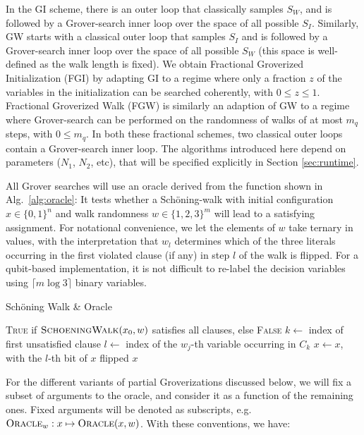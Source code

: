 \documentclass[a4paper,aps,floatfix]{revtex4}
\begin{document}
In the GI scheme, there is an outer loop that classically samples $S_W$, and is followed by a Grover-search inner loop over the space of all possible $S_I$. Similarly, GW starts with a classical outer loop that samples $S_I$ and is followed by a Grover-search inner loop over the space of all possible $S_W$ (this space is well-defined as the walk length is fixed).
We obtain Fractional Groverized Initialization (FGI) by adapting GI to a regime where only a fraction $z$ of the variables in the initialization can be searched coherently, with $0\le z \le1$. 
Fractional Groverized Walk (FGW) is similarly an adaption of GW to a regime where Grover-search can be performed on the randomness of walks of at most $m_q$ steps, with $0 \le m_q$. 
In both these fractional schemes, two classical outer loops contain a Grover-search inner loop.  
The algorithms introduced here depend on parameters ($N_1$, $N_2$, etc), that will be specified explicitly in Section \ref{sec:runtime}. 

All Grover searches will use an oracle derived from the function shown in Alg.~\ref{alg:oracle}:
It tests whether a Sch\"oning-walk with initial configuration $x\in\{0,1\}^n$ and walk randomness $w\in\{1,2,3\}^m$ will lead to a satisfying assignment.
For notational convenience, we let the elements of $w$ take ternary in values, with the interpretation that $w_l$ determines which of the three literals occurring in the first violated clause (if any) in step $l$ of the walk is flipped.
For a qubit-based implementation, it is not difficult to re-label the decision variables using $\lceil m \log 3\rceil$ binary variables.


\begin{algorithm}[H]
	\caption{Sch\"oning Walk \& Oracle}\label{alg:oracle}
	\begin{algorithmic}[1]
			\State \Return \textsc{True} if $\textsc{SchoeningWalk}(x_0,w)$ satisfies all clauses, else \textsc{False}
	\EndFunction
	\State
						\State $k\leftarrow$ index of first unsatisfied clause
						\State $l\leftarrow$ index of the $w_j$-th variable occurring in $C_k$
						\State $x\leftarrow x$, with the $l$-th bit of $x$ flipped
					\EndIf
				\EndFor
				\State \Return $x$
	\EndFunction
	\end{algorithmic}
\end{algorithm}

For the different variants of partial Groverizations discussed below, we will fix a subset of arguments to the oracle, and consider it as a function of the remaining ones.
Fixed arguments will be denoted as subscripts, e.g.\ $\textsc{Oracle}_w: x\mapsto \textsc{Oracle}(x,w)$.
With these conventions, we have:
\end{document}
